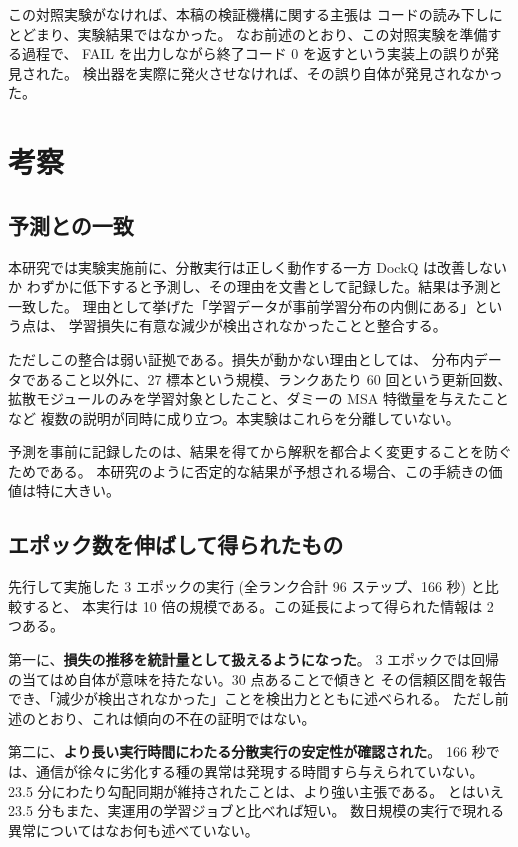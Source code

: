 \documentclass[11pt,a4paper]{article}
\begin{document}
この対照実験がなければ、本稿の検証機構に関する主張は
コードの読み下しにとどまり、実験結果ではなかった。
なお前述のとおり、この対照実験を準備する過程で、
FAIL を出力しながら終了コード 0 を返すという実装上の誤りが発見された。
検出器を実際に発火させなければ、その誤り自体が発見されなかった。

\section{考察}

\subsection{予測との一致}

本研究では実験実施前に、分散実行は正しく動作する一方 DockQ は改善しないか
わずかに低下すると予測し、その理由を文書として記録した。結果は予測と一致した。
理由として挙げた「学習データが事前学習分布の内側にある」という点は、
学習損失に有意な減少が検出されなかったことと整合する。

ただしこの整合は弱い証拠である。損失が動かない理由としては、
分布内データであること以外に、27 標本という規模、ランクあたり 60 回という更新回数、
拡散モジュールのみを学習対象としたこと、ダミーの MSA 特徴量を与えたことなど
複数の説明が同時に成り立つ。本実験はこれらを分離していない。

予測を事前に記録したのは、結果を得てから解釈を都合よく変更することを防ぐためである。
本研究のように否定的な結果が予想される場合、この手続きの価値は特に大きい。

\subsection{エポック数を伸ばして得られたもの}

先行して実施した 3 エポックの実行 (全ランク合計 96 ステップ、166 秒) と比較すると、
本実行は 10 倍の規模である。この延長によって得られた情報は 2 つある。

第一に、\textbf{損失の推移を統計量として扱えるようになった}。
3 エポックでは回帰の当てはめ自体が意味を持たない。30 点あることで傾きと
その信頼区間を報告でき、「減少が検出されなかった」ことを検出力とともに述べられる。
ただし前述のとおり、これは傾向の不在の証明ではない。

第二に、\textbf{より長い実行時間にわたる分散実行の安定性が確認された}。
166 秒では、通信が徐々に劣化する種の異常は発現する時間すら与えられていない。
23.5 分にわたり勾配同期が維持されたことは、より強い主張である。
とはいえ 23.5 分もまた、実運用の学習ジョブと比べれば短い。
数日規模の実行で現れる異常についてはなお何も述べていない。
\end{document}

